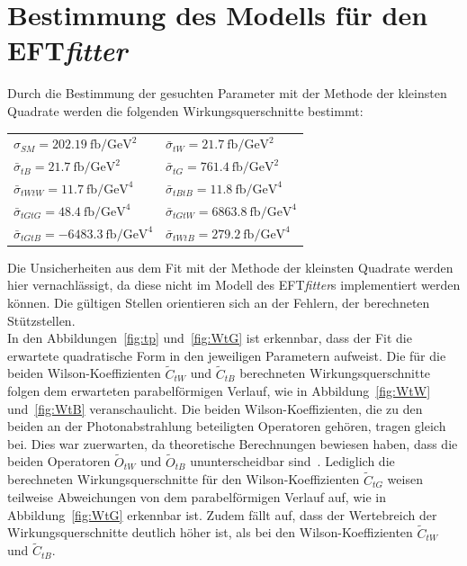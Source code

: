 \section{Bestimmung des Modells für den EFT\textit{fitter}}
\label{Modell}
Durch die Bestimmung der gesuchten Parameter mit der Methode der kleinsten Quadrate werden die folgenden Wirkungsquerschnitte bestimmt:
\begin{table}[H]
    \centering
   \begin{tabular}{ll}
     $\sigma_{SM}   = \SI{202.19}{\femto\barn\per\giga\electronvolt\squared} $  & $\bar{\sigma}_{tW}   = \SI{21.7}{\femto\barn\per\giga\electronvolt\squared}$\\
     $\bar{\sigma}_{tB}   = \SI{21.7}{\femto\barn\per\giga\electronvolt\squared}$    & $\bar{\sigma}_{tG}   = \SI{761.4}{\femto\barn\per\giga\electronvolt\squared}$\\
     $\bar{\sigma}_{tWtW} = \SI{11.7}{\femto\barn\per\giga\electronvolt\tothe{4}}$    & $\bar{\sigma}_{tBtB} = \SI{11.8}{\femto\barn\per\giga\electronvolt\tothe{4}}$\\
     $\bar{\sigma}_{tGtG} = \SI{48.4}{\femto\barn\per\giga\electronvolt\tothe{4}}$    & $\bar{\sigma}_{tGtW} = \SI{6863.8}{\femto\barn\per\giga\electronvolt\tothe{4}}$\\
     $\bar{\sigma}_{tGtB} = \SI{-6483.3}{\femto\barn\per\giga\electronvolt\tothe{4}}$ & $\bar{\sigma}_{tWtB} = \SI{279.2}{\femto\barn\per\giga\electronvolt\tothe{4}}$
   \end{tabular}
\end{table}
Die Unsicherheiten aus dem Fit mit der Methode der kleinsten Quadrate werden hier vernachlässigt, da diese nicht im Modell des EFT\textit{fitter}s implementiert werden können. Die gültigen Stellen orientieren sich an der Fehlern, der berechneten Stützstellen.\\
In den Abbildungen~\ref{fig:tp} und~\ref{fig:WtG} ist erkennbar, dass der Fit die erwartete quadratische Form in den jeweiligen Parametern aufweist. Die für die beiden Wilson-Koeffizienten $\tilde{C}_{tW}$ und $\tilde{C}_{tB}$ berechneten Wirkungsquerschnitte folgen dem erwarteten parabelförmigen Verlauf, wie in Abbildung~\ref{fig:WtW} und~\ref{fig:WtB} veranschaulicht. Die beiden Wilson-Koeffizienten, die zu den beiden an der Photonabstrahlung beteiligten Operatoren gehören, tragen gleich bei. Dies war zuerwarten, da theoretische Berechnungen bewiesen haben, dass die beiden Operatoren $\tilde{O}_{tW}$ und $\tilde{O}_{tB}$ ununterscheidbar sind~\cite{Bylund:2016phk}. Lediglich die berechneten Wirkungsquerschnitte für den Wilson-Koeffizienten $\tilde{C}_{tG}$ weisen teilweise Abweichungen von dem parabelförmigen Verlauf auf, wie in Abbildung~\ref{fig:WtG} erkennbar ist. Zudem fällt auf, dass der Wertebreich der Wirkungsquerschnitte deutlich höher ist, als bei den Wilson-Koeffizienten $\tilde{C}_{tW}$ und $\tilde{C}_{tB}$.\\
